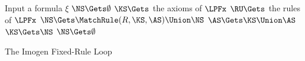 
\begin{algorithm}
\begin{algorithmic}[1]
\STATE Input a formula $\xi$
\STATE $\NS \Gets \emptyset$
\STATE $\KS \Gets $ the axioms of $\LPFx$
\STATE $\RU \Gets $ the rules of $\LPFx$
\WHILE{$\KS \neq \emptyset$} \label{ruleloop:while}
    \STATE $\NS \Gets \MatchRule(R, \KS, \AS) \Union \NS$
  \ENDFOR
    \PRINT {}
    \RETURN
  \ENDIF
  \STATE $\AS \Gets \KS \Union \AS$
  \STATE $\KS \Gets \NS$
  \STATE $\NS \Gets \emptyset$
\ENDWHILE
\PRINT {}
\RETURN
\end{algorithmic}
\caption{The Imogen Fixed-Rule Loop}
\label{prop.fixed-rule}
\end{algorithm}

